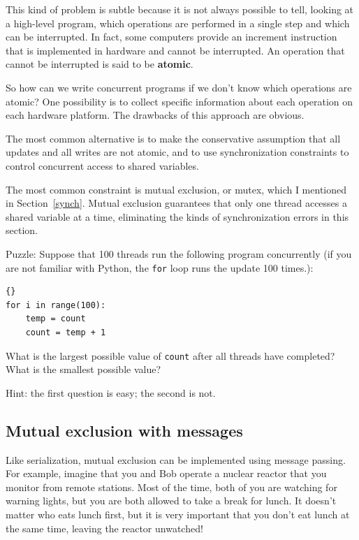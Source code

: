 \documentclass{book}
\begin{document}
This kind of problem is subtle because it is not always possible to
tell, looking at a high-level program, which operations are
performed in a single step and which can be interrupted.
In fact, some computers provide an increment instruction that
is implemented in hardware and cannot be interrupted.
An operation that cannot be interrupted is said to be
{\bf atomic}.

So how can we write concurrent programs if we don't know which
operations are atomic?  One possibility is to collect specific
information about each operation on each hardware platform.
The drawbacks of this approach are obvious.

The most common alternative is to make the conservative
assumption that all updates and all writes are not atomic,
and to use synchronization constraints to control concurrent
access to shared variables.

The most common constraint is mutual exclusion, or mutex,
which I mentioned in Section~\ref{synch}.  Mutual exclusion guarantees
that only one thread accesses a shared variable at a time,
eliminating the kinds of synchronization errors in this section.

Puzzle: Suppose that 100 threads run the following program concurrently
(if you are not familiar with Python, the {\tt for} loop runs the update
100 times.):

\begin{lstlisting}[]{}
for i in range(100):
    temp = count
    count = temp + 1
\end{lstlisting}

What is the largest possible value of {\tt count} after all threads
have completed?  What is the smallest possible value?

Hint: the first question is easy; the second is not.

\subsection {Mutual exclusion with messages}

Like serialization, mutual exclusion
can be implemented using message passing.  For example, imagine that
you and Bob operate a nuclear reactor that you monitor from remote
stations.  Most of the time, both of you are watching for warning
lights, but you are both allowed to take a break for lunch.  It
doesn't matter who eats lunch first, but it is very important that
you don't eat lunch at the same time, leaving the reactor unwatched!
\end{document}
